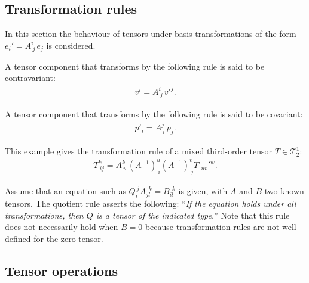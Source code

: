 \subsection{Transformation rules}

    In this section the behaviour of tensors under basis transformations of the form $e_i' = A^i_{\ j}\,e_j$ is considered.

    \begin{definition}[Contravariant]\label{vector:contravariant}
        A tensor component that transforms by the following rule is said to be contravariant:
        \begin{gather}
            v^i = A^i_{\ j}\,v'^j.
        \end{gather}
    \end{definition}
    \begin{definition}[Covariant]\label{vector:covariant}
        A tensor component that transforms by the following rule is said to be covariant:
        \begin{gather}
            p'_i = A^j_{\ i}\,p_j.
        \end{gather}
    \end{definition}
    \begin{example}
        This example gives the transformation rule of a mixed third-order tensor $T\in\mathcal{T}^1_2$:
        \begin{gather}
            T_{\ ij}^k = A^k_{\ w}(A^{-1})^u_{\ i}(A^{-1})^v_{\ j}T_{\ \ uv}'^w.
        \end{gather}
    \end{example}

    \begin{method}
        Assume that an equation such as $Q_i^{\ j}A_{jl}^{\ \ k}=B_{il}^{\ \ k}$ is given, with $A$ and $B$ two known tensors. The quotient rule asserts the following: ``\textit{If the equation holds under all transformations, then $Q$ is a tensor of the indicated type.}'' Note that this rule does not necessarily hold when $B=0$ because transformation rules are not well-defined for the zero tensor.
    \end{method}

\subsection{Tensor operations}

